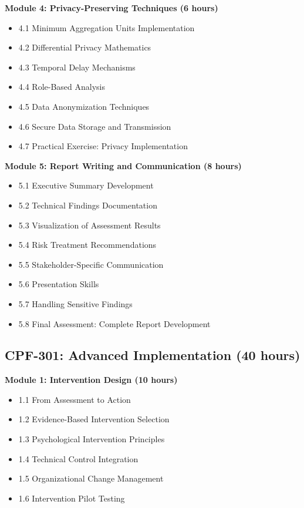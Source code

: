 \documentclass[11pt,a4paper]{article}
\begin{document}
\textbf{Module 4: Privacy-Preserving Techniques (6 hours)}
\begin{itemize}
\item 4.1 Minimum Aggregation Units Implementation
\item 4.2 Differential Privacy Mathematics
\item 4.3 Temporal Delay Mechanisms
\item 4.4 Role-Based Analysis
\item 4.5 Data Anonymization Techniques
\item 4.6 Secure Data Storage and Transmission
\item 4.7 Practical Exercise: Privacy Implementation
\end{itemize}

\textbf{Module 5: Report Writing and Communication (8 hours)}
\begin{itemize}
\item 5.1 Executive Summary Development
\item 5.2 Technical Findings Documentation
\item 5.3 Visualization of Assessment Results
\item 5.4 Risk Treatment Recommendations
\item 5.5 Stakeholder-Specific Communication
\item 5.6 Presentation Skills
\item 5.7 Handling Sensitive Findings
\item 5.8 Final Assessment: Complete Report Development
\end{itemize}

\subsection{CPF-301: Advanced Implementation (40 hours)}

\textbf{Module 1: Intervention Design (10 hours)}
\begin{itemize}
\item 1.1 From Assessment to Action
\item 1.2 Evidence-Based Intervention Selection
\item 1.3 Psychological Intervention Principles
\item 1.4 Technical Control Integration
\item 1.5 Organizational Change Management
\item 1.6 Intervention Pilot Testing
\end{itemize}
\end{document}
